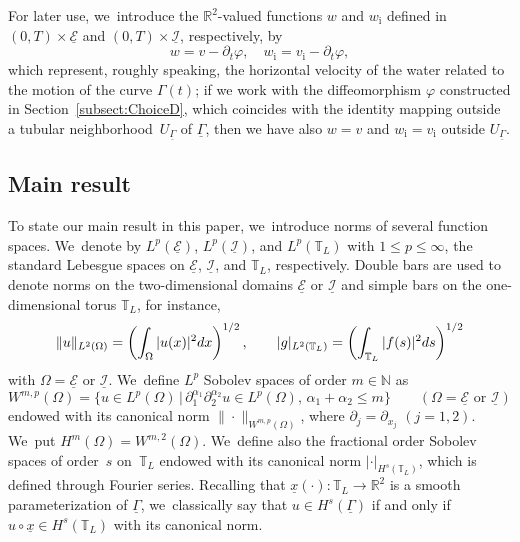 \documentclass[11pt]{article}
\newcommand{\R}{{\mathbb R}}
\newcommand{\N}{{\mathbb N}}
\newcommand{\dt}{\partial_t}
\newcommand{\cI}{{\mathcal I}}
\newcommand{\cE}{{\mathcal E}}
\newcommand{\ul}[1]{\underline{#1}}
\newcommand{\itGamma}{\mathit{\Gamma}}
\theoremstyle{definition}
\begin{document}
For later use, we~introduce the $\R^2$-valued functions $w$ and $w_\mathrm{i}$ defined in $(0,T)\times\ul{\cE}$ and $(0,T)\times\ul{\cI}$, respectively, by
\begin{equation}\label{defw}
w=v-\dt\varphi, \quad w_\mathrm{i}=v_\mathrm{i}-\dt\varphi,
\end{equation}
which represent, roughly speaking, the horizontal velocity of the water related to the motion of the curve $\itGamma(t)$;
if we work with the diffeomorphism $\varphi$ constructed in Section~\ref{subsect:ChoiceD},
which coincides with the identity mapping outside a tubular neighborhood~$U_{\ul{\itGamma}}$ of $\ul{\itGamma}$,
then we have also $w=v$ and $w_\mathrm{i}=v_\mathrm{i}$ outside $U_{\ul{\itGamma}}$.

\subsection{Main result}\label{subsect:result}
To state our main result in this paper, we~introduce norms of several function spaces. We~denote by $L^p(\ul{\cE})$, $L^p(\ul{\cI})$, and $L^p(\mathbb{T}_L)$ with $1\leq p\leq \infty$,
the standard Lebesgue spaces on $\ul{\cE}$, $\ul{\cI}$, and $\mathbb{T}_L$, respectively.
Double bars are used to denote norms on the two-dimensional domains $\ul{\cE}$ or $\ul{\cI}$ and simple bars on the one-dimensional torus $\mathbb{T}_L$,
for instance,
\[
\|u\|_{L^2(\Omega)}=\left(\int_\Omega |u(x)|^2 {\rm d}x \right)^{1/2}, \qquad
|g|_{L^2(\mathbb{T}_L)}=\left(\int_{\mathbb{T}_L} |f(s)|^2 {\rm d}s \right)^{1/2}
\]
with $\Omega=\ul{\cE}$ or $\ul{\cI}$. We~define $L^p$ Sobolev spaces of order $m\in \N$ as
\[
W^{m,p}(\Omega)=\{ u\in L^p(\Omega) \,|\, \partial_1^{\alpha_1}\partial_2^{\alpha_2} u \in L^p(\Omega),\, \alpha_1+\alpha_2\leq m\}
\qquad (\Omega=\ul{\cE} \mbox{ or } \ul{\cI})
\]
endowed with its canonical norm $\|\cdot\|_{W^{m,p}(\Omega)}$, where $\partial_j=\partial_{x_j}$ $(j=1,2)$. We~put $H^m(\Omega)=W^{m,2}(\Omega)$. We~define also the fractional order Sobolev spaces of order~$s$ on~$\mathbb{T}_L$ endowed with its canonical norm $|\cdot|_{H^s(\mathbb{T}_L)}$,
which is defined through Fourier series.
Recalling that $\ul{x}(\cdot):{\mathbb T}_L\to {\mathbb R}^2$ is a smooth parameterization of $\ul{\itGamma}$, we~classically say that $u\in H^s(\ul{\itGamma})$ if and only if $u\circ\ul{x}\in H^s({\mathbb T}_L)$ with its canonical norm.
\end{document}
